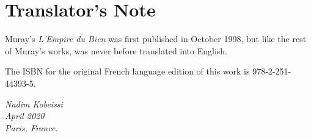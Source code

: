 \chapter*{Translator's Note}
\label{ch:notes}

Muray's \textit{L'Empire du Bien} was first published in October 1998, but like the rest of Muray's works, was never before translated into English.

The ISBN for the original French language edition of this work is 978-2-251-44393-5.

\begin{flushright}
	\textit{Nadim Kobeissi\\April 2020\\Paris, France.}
\end{flushright}